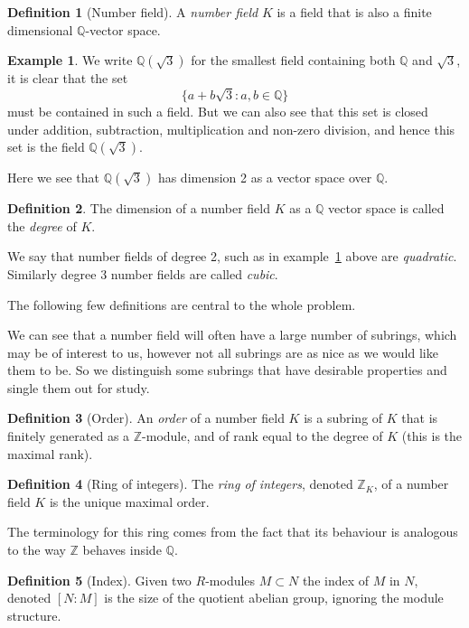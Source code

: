 \documentclass[a4paper,abstracton]{scrreprt}
\theoremstyle{definition}
\newtheorem{defn}{Definition}
\newtheorem{ex}{Example}
\newcommand{\QQ}{\mathbb{Q}}
\newcommand{\ZZ}{\mathbb{Z}}
\begin{document}
\begin{defn}[Number field]
A \emph{number field} $K$ is a field that is also a finite dimensional $\QQ$-vector space.
\end{defn}

\begin{ex}\label{ex:quad}
We write $\QQ(\sqrt{3})$ for the smallest field containing both $\QQ$ and $\sqrt{3}$, it is clear that the set
\[
\{a + b\sqrt{3}\colon a,b \in \QQ\}
\]
must be contained in such a field.
But we can also see that this set is closed under addition, subtraction, multiplication and non-zero division, and hence this set is the field $\QQ(\sqrt{3})$.

Here we see that $\QQ(\sqrt{3})$ has dimension 2 as a vector space over $\QQ$.
\end{ex}

\begin{defn}
The dimension of a number field $K$ as a $\QQ$ vector space is called the \emph{degree} of $K$.

We say that number fields of degree 2, such as in example~\ref{ex:quad} above are \emph{quadratic}.
Similarly degree 3 number fields are called \emph{cubic}.
\end{defn}

The following few definitions are central to the whole problem.

We can see that a number field will often have a large number of subrings, which may be of interest to us, however not all subrings are as nice as we would like them to be.
So we distinguish some subrings that have desirable properties and single them out for study.

\begin{defn}[Order]
An \emph{order} of a number field $K$ is a subring of $K$ that is finitely generated as a $\ZZ$-module, and of rank equal to the degree of $K$ (this is the maximal rank).
\end{defn}


\begin{defn}[Ring of integers]
The \emph{ring of integers}, denoted $\ZZ_K$, of a number field $K$ is the unique maximal order.
\end{defn}

The terminology for this ring comes from the fact that its behaviour is analogous to the way $\ZZ$ behaves inside $\QQ$.

\begin{defn}[Index]
Given two $R$-modules $M \subset N$ the index of $M$ in $N$, denoted $[N\colon M]$ is the size of the quotient abelian group, ignoring the module structure.
\end{defn}
\end{document}
